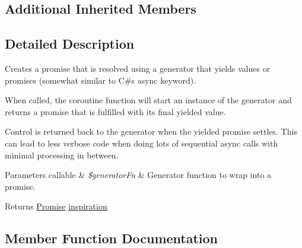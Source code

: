 \subsection*{Additional Inherited Members}


\subsection{Detailed Description}
Creates a promise that is resolved using a generator that yields values or promises (somewhat similar to C\#\textquotesingle{}s async keyword).

When called, the coroutine function will start an instance of the generator and returns a promise that is fulfilled with its final yielded value.

Control is returned back to the generator when the yielded promise settles. This can lead to less verbose code when doing lots of sequential async calls with minimal processing in between. 



\begin{DoxyParams}[1]{Parameters}
callable & {\em \$generator\+Fn} & Generator function to wrap into a promise.\\
\hline
\end{DoxyParams}
\begin{DoxyReturn}{Returns}
\hyperlink{classGuzzleHttp_1_1Promise_1_1Promise}{Promise} \hyperlink{}{inspiration }
\end{DoxyReturn}


\subsection{Member Function Documentation}
\mbox{\label{classGuzzleHttp_1_1Promise_1_1Coroutine_a7c999f58d48a3678a4e86b1796232649}} 
